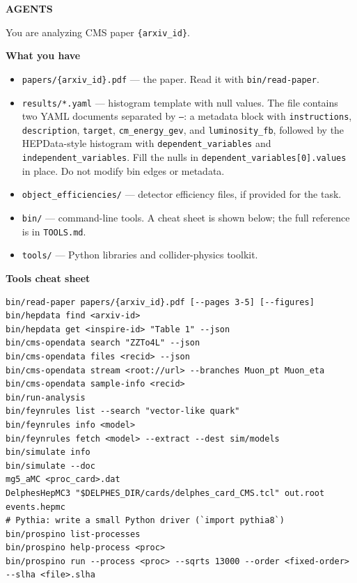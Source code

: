 \documentclass{article}
\begin{document}
\begin{agentcard}
\small
\textbf{AGENTS}

You are analyzing CMS paper \texttt{\{arxiv\_id\}}.

\medskip
\textbf{What you have}
\begin{itemize}
    \item \texttt{papers/\{arxiv\_id\}.pdf} --- the paper. Read it with \texttt{bin/read-paper}.

    \item \texttt{results/*.yaml} --- histogram template with null values. The file contains two YAML documents separated by \texttt{---}: a metadata block with \texttt{instructions}, \texttt{description}, \texttt{target}, \texttt{cm\_energy\_gev}, and \texttt{luminosity\_fb}, followed by the HEPData-style histogram with \texttt{dependent\_variables} and \texttt{independent\_variables}. Fill the nulls in \texttt{dependent\_variables[0].values} in place. Do not modify bin edges or metadata.

    \item \texttt{object\_efficiencies/} --- detector efficiency files, if provided for the task.

    \item \texttt{bin/} --- command-line tools. A cheat sheet is shown below; the full reference is in \texttt{TOOLS.md}.

    \item \texttt{tools/} --- Python libraries and collider-physics toolkit.
\end{itemize}
\medskip
\textbf{Tools cheat sheet}

\begin{lstlisting}[basicstyle=\ttfamily\scriptsize,breaklines=true]
bin/read-paper papers/{arxiv_id}.pdf [--pages 3-5] [--figures]
bin/hepdata find <arxiv-id>
bin/hepdata get <inspire-id> "Table 1" --json
bin/cms-opendata search "ZZTo4L" --json
bin/cms-opendata files <recid> --json
bin/cms-opendata stream <root://url> --branches Muon_pt Muon_eta
bin/cms-opendata sample-info <recid>
bin/run-analysis
bin/feynrules list --search "vector-like quark"
bin/feynrules info <model>
bin/feynrules fetch <model> --extract --dest sim/models
bin/simulate info
bin/simulate --doc
mg5_aMC <proc_card>.dat
DelphesHepMC3 "$DELPHES_DIR/cards/delphes_card_CMS.tcl" out.root events.hepmc
# Pythia: write a small Python driver (`import pythia8`)
bin/prospino list-processes
bin/prospino help-process <proc>
bin/prospino run --process <proc> --sqrts 13000 --order <fixed-order> --slha <file>.slha
\end{lstlisting}
\end{agentcard}
\end{document}
